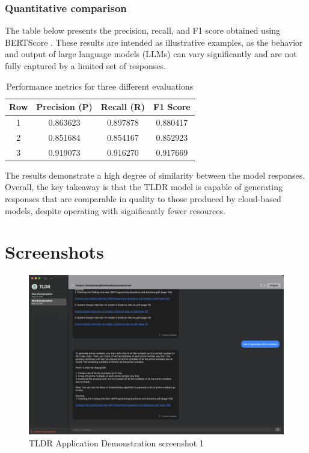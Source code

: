 \subsubsection{Quantitative comparison}
\label{subsubsec:tldrresultQuantitativecomparison}
The table below presents the precision, recall, and F1 score obtained using BERTScore \cite{bert-score}. These results are intended as illustrative examples, as the behavior and output of large language models (LLMs) can vary significantly and are not fully captured by a limited set of responses.

\begin{table}[h!]
\centering
\begin{tabular}{|c|c|c|c|}
\hline
\textbf{Row} & \textbf{Precision (P)} & \textbf{Recall (R)} & \textbf{F1 Score} \\
\hline
1 & 0.863623 & 0.897878 & 0.880417 \\
2 & 0.851684 & 0.854167 & 0.852923 \\
3 & 0.919073 & 0.916270 & 0.917669 \\
\hline
\end{tabular}
\caption{Performance metrics for three different evaluations}
\label{tab:metrics}
\end{table}
The results demonstrate a high degree of similarity between the model responses. Overall, the key takeaway is that the TLDR model is capable of generating responses that are comparable in quality to those produced by cloud-based models, despite operating with significantly fewer resources.
\section{Screenshots}
\label{SampleScreenshots}
\begin{figure}[h]
    \centering
    \includegraphics[width=1.0\linewidth]{images/result1.png}
    \caption{TLDR Application  Demonstration screenshot 1}
    \label{fig:tldrmodulesinteraction}
\end{figure}


